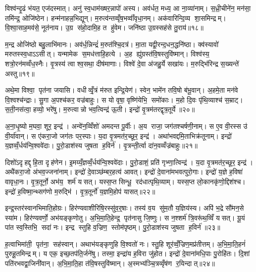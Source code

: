विश्व॑न्दृ॒ढं भ॑यत॒ एज॑दस्मात्। अनु॑ स्व॒धाम॑ख्षर॒न्नापो॑ अस्य। अव॑र्धत॒ मध्य॒ आ ना॒व्या॑नाम्। स॒ध्री॒चीने॑न॒ मन॑सा॒ तमि॑न्द्र॒ ओजि॑ष्ठेन। हन्म॑नाहन्न॒भिद्यून्। म॒रुत्व॑न्तव्वृँष॒भव्वाँ॑वृधा॒नम्। अक॑वारिन्दि॒व्य शा॒समिन्द्रम्। वि॒श्वा॒साह॒मव॑से॒ नूत॑नाय। उ॒ग्र स॑हो॒दामि॒ह त हु॑वेम। जनि॑ष्ठा उ॒ग्रस्सह॑से तु॒राय॑॥१८॥

म॒न्द्र ओजि॑ष्ठो बहु॒लाभि॑मानः। अव॑र्ध॒न्निन्द्रं॑ म॒रुत॑श्चि॒दत्र॑। मा॒ता यद्वी॒रन्द॒धन॒द्धनि॑ष्ठा। क्व॑स्यावो॑ मरुतस्स्व॒धाऽऽसीत्। यन्मामेक स॒मध॑त्ताहि॒हत्ये। अ॒ह ह्यु॑ग्रस्त॑वि॒षस्तुवि॑ष्मान्। विश्व॑स्य॒ शत्रो॒रन॑मव्वँध॒स्नैः। वृ॒त्रस्य॑ त्वा श्व॒सथा॒ दीष॑माणाः। विश्वे॑ दे॒वा अ॑जहु॒र्ये सखा॑यः। म॒रुद्भि॑रिन्द्र स॒ख्यन्ते॑ अस्तु॥१९॥

अथे॒मा विश्वा॒ पृत॑ना जयासि। वधीव्वृँ॒त्रं म॑रुत इन्द्रि॒येण॑। स्वेन॒ भामे॑न तवि॒षो ब॑भू॒वान्। अ॒हमे॒ता मन॑वे वि॒श्वश्च॑न्द्राः। सु॒गा अ॒पश्च॑कर॒ वज्र॑बाहुः। स यो वृषा॒ वृष्णि॑येभि॒ समो॑काः। म॒हो दि॒वः पृ॑थि॒व्याश्च॑ स॒म्राट्। स॒ती॒नस॑त्वा॒ हव्यो॒ भरे॑षु। म॒रुत्वान्नो भव॒त्विन्द्र॑ ऊ॒ती। इन्द्रो॑ वृ॒त्रम॑तरद्वृत्र॒तूर्ये॥२०॥

अ॒ना॒धृ॒ष्यो म॒घवा॒ शूर॒ इन्द्र॑। अन्वे॑न॒व्विँशो॑ अमदन्त पू॒र्वीः। अ॒य राजा॒ जग॑तश्चर्\mbox{}षणी॒नाम्। स ए॒व वी॒रस्स उ॑ वी॒र्या॑वान्। स ए॑करा॒जो जग॑तः पर॒स्पाः। य॒दा वृ॒त्रमत॑र॒च्छूर॒ इन्द्र॑। अथा॑भवद्दमि॒ताभिक्र॑तूनाम्। इन्द्रो॑ य॒ज्ञव्वँ॒र्धय॑न्वि॒श्ववे॑दाः। पु॒रो॒डाश॑स्य जुषता ह॒विर्न॑। वृ॒त्रन्ती॒र्त्वा दा॑न॒वव्वँज्र॑बाहुः॥२१॥

दिशो॑ऽदृहद्दृहि॒ता दृह॑णेन। इ॒मय्यँ॒ज्ञव्वँ॒र्धय॑न्वि॒श्ववे॑दाः। पु॒रो॒डाशं॒ प्रति॑ गृभ्णा॒त्विन्द्र॑। य॒दा वृ॒त्रमत॑र॒च्छूर॒ इन्द्र॑। अथै॑करा॒जो अ॑भव॒ज्जना॑नाम्। इन्द्रो॑ दे॒वाञ्छ॑म्बर॒हत्य॑ आवत्। इन्द्रो॑ दे॒वाना॑मभवत्पुरो॒गाः। इन्द्रो॑ य॒ज्ञे ह॒विषा॑ वावृधा॒नः। वृ॒त्र॒तूर्नो॒ अभ॑य॒ शर्म॑ यसत्। यस्स॒प्त सिन्धू॒ रद॑धात्पृथि॒व्याम्। यस्स॒प्त लो॒कानकृ॑णो॒द्दिश॑श्च। इन्द्रो॑ ह॒विष्मा॒न्थ्सग॑णो म॒रुद्भि॑। वृ॒त्र॒तूर्नो॑ य॒ज्ञमि॒होप॑ यासत्॥२२॥\anuvakamend[व॒व॒र्थ॒ वि॒थ्स॒ इन्द्र॑स्तु॒रायास्तु वृत्र॒तूर्ये॒ वज्र॑बाहुः पृथि॒व्यान्त्रीणि॑ च]

इन्द्र॒स्तर॑स्वानभिमाति॒होग्रः। हिर॑ण्यवाशीरिषि॒रस्सु॑व॒र्॒षाः। तस्य॑ व॒य सु॑म॒तौ य॒ज्ञिय॑स्य। अपि॑ भ॒द्रे सौ॑मन॒से स्या॑म। हिर॑ण्यवर्णो॒ अभ॑यङ्कृणोतु। अ॒भि॒मा॒ति॒हेन्द्र॒ पृत॑नासु जि॒ष्णुः। स न॒श्शर्म॑ त्रि॒वरू॑थ॒व्विँ यसत्। यू॒यं पा॑त स्व॒स्तिभि॒ सदा॑ नः। इन्द्र स्तुहि व॒ज्रिण॒ स्तोम॑पृष्ठम्। पु॒रो॒डाश॑स्य जुषता ह॒विर्न॑॥२३॥

ह॒त्वाभिमा॑ती॒ पृत॑ना॒ सह॑स्वान्। अथाभ॑यङ्कृणुहि वि॒श्वतो॑ नः। स्तु॒हि शूर॑व्वँ॒ज्रिण॒मप्र॑तीत्तम्। अ॒भि॒मा॒ति॒हनं॑ पुरुहू॒तमिन्द्रम्। य एक॒ इच्छ॒तप॑ति॒र्जने॑षु। तस्मा॒ इन्द्रा॑य ह॒विरा जु॑होत। इन्द्रो॑ दे॒वाना॑मधि॒पाः पु॒रोहि॑तः। दि॒शां पति॑रभवद्वा॒जिनी॑वान्। अ॒भि॒मा॒ति॒हा त॑वि॒षस्तुवि॑ष्मान्। अ॒स्मभ्य॑ञ्चि॒त्रव्वृँष॑ण र॒यिन्दात्॥२४॥

